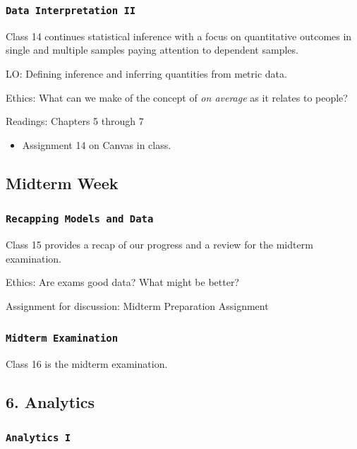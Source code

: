 \documentclass[11pt,]{article}
\begin{document}
\subsubsection{\texorpdfstring{\texttt{Data\ Interpretation\ II}}{Data Interpretation II}}\label{data-interpretation-ii}

Class 14 continues statistical inference with a focus on quantitative
outcomes in single and multiple samples paying attention to dependent
samples.

LO: Defining inference and inferring quantities from metric data.

Ethics: What can we make of the concept of \emph{on average} as it
relates to people?

Readings: Chapters 5 through 7

\begin{itemize}
\item Assignment 14 on Canvas in class.
\end{itemize}

\subsection{Midterm Week}\label{midterm-week}

\subsubsection{\texorpdfstring{\texttt{Recapping\ Models\ and\ Data}}{Recapping Models and Data}}\label{recapping-models-and-data}

Class 15 provides a recap of our progress and a review for the midterm
examination.

Ethics: Are exams good data? What might be better?

Assignment for discussion: Midterm Preparation Assignment

\subsubsection{\texorpdfstring{\texttt{Midterm\ Examination}}{Midterm Examination}}\label{midterm-examination}

Class 16 is the midterm examination.

\subsection{6. Analytics}\label{analytics}

\subsubsection{\texorpdfstring{\texttt{Analytics\ I}}{Analytics I}}\label{analytics-i}
\end{document}
